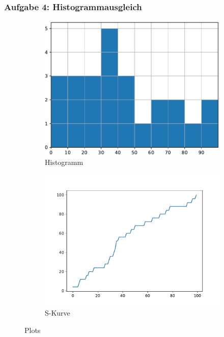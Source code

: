 \documentclass[accentcolor=tud9c,colorbacktitle,inverttitle,landscape,german,presentation,t]{tudbeamer}
\begin{document}
	\begin{frame}[t]
		\frametitle{Aufgabe 4: Histogrammausgleich}
		\begin{figure}	
			\centering
			\begin{subfigure}[t]{.45\textwidth}
				\centering
				\includegraphics[width=\textwidth]{fig/histogram.pdf}
				\caption{Histogramm}\label{fig:1a}		
			\end{subfigure}
			\quad
			\begin{subfigure}[t]{.45\textwidth}
				\centering
				\includegraphics[width=\textwidth]{fig/s-curve.pdf}
				\caption{S-Kurve}\label{fig:1b}
			\end{subfigure}
			\caption{Plots}\label{fig:1}
		\end{figure}
	\end{frame}
\end{document}
